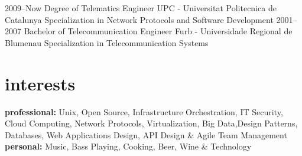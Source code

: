 \documentclass[]{friggeri-cv} %
\begin{document}
\begin{entrylist}
\entry
{2009--Now}
{Degree {\normalfont of Telematics Engineer}}
{UPC - Universitat Politecnica de Catalunya}
{Specialization in Network Protocols and Software Development}
\entry
{2001--2007}
{Bachelor {\normalfont of Telecommunication Engineer}}
{Furb -  Universidade Regional de Blumenau}
{Specialization in Telecommunication Systems}
\end{entrylist}

\section{interests}

\textbf{professional:} Unix, Open Source, Infrastructure Orchestration, IT Security, Cloud Computing, Network Protocols, Virtualization, Big Data,Design Patterns, Databases, Web Applications Design, API Design \& Agile Team Management \\ 
\textbf{personal:} Music, Bass Playing, Cooking, Beer, Wine \& Technology 
\end{document}

